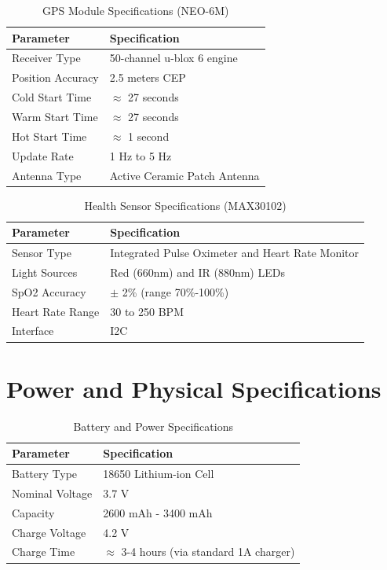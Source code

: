 \begin{table}[htbp]
\centering
\caption{GPS Module Specifications (NEO-6M)}
\label{tab:spec-gps}
\begin{tabular}{@{}ll@{}}
\toprule
\textbf{Parameter} & \textbf{Specification} \\ \midrule
Receiver Type & 50-channel u-blox 6 engine \\
Position Accuracy & 2.5 meters CEP \\
Cold Start Time & $\approx$ 27 seconds \\
Warm Start Time & $\approx$ 27 seconds \\
Hot Start Time & $\approx$ 1 second \\
Update Rate & 1 Hz to 5 Hz \\
Antenna Type & Active Ceramic Patch Antenna \\
\bottomrule
\end{tabular}
\end{table}

\begin{table}[htbp]
\centering
\caption{Health Sensor Specifications (MAX30102)}
\label{tab:spec-sensor}
\begin{tabular}{@{}ll@{}}
\toprule
\textbf{Parameter} & \textbf{Specification} \\ \midrule
Sensor Type & Integrated Pulse Oximeter and Heart Rate Monitor \\
Light Sources & Red (660nm) and IR (880nm) LEDs \\
SpO2 Accuracy & $\pm$ 2\% (range 70\%-100\%) \\
Heart Rate Range & 30 to 250 BPM \\
Interface & I2C \\
\bottomrule
\end{tabular}
\end{table}

\section{Power and Physical Specifications}

\begin{table}[htbp]
\centering
\caption{Battery and Power Specifications}
\label{tab:spec-battery}
\begin{tabular}{@{}ll@{}}
\toprule
\textbf{Parameter} & \textbf{Specification} \\ \midrule
Battery Type & 18650 Lithium-ion Cell \\
Nominal Voltage & 3.7 V \\
Capacity & 2600 mAh - 3400 mAh \\
Charge Voltage & 4.2 V \\
Charge Time & $\approx$ 3-4 hours (via standard 1A charger) \\
\bottomrule
\end{tabular}
\end{table}

